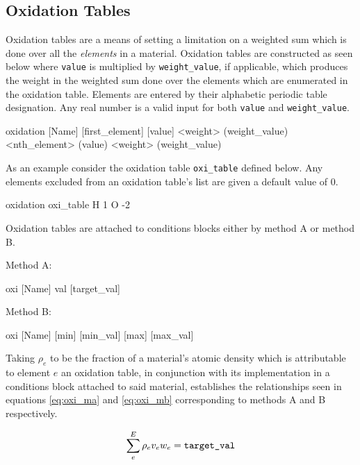 \subsection{Oxidation Tables}\label{ssec:oxidation}
Oxidation tables are a means of setting a limitation on a weighted sum which
is done over all the \textit{elements} in a material. Oxidation tables are
constructed as seen below where \texttt{value} is multiplied by
\texttt{weight\_value}, if applicable, which produces the weight in the weighted
sum done over the elements which are enumerated in the oxidation table. Elements
are entered by their alphabetic periodic table designation. Any real number
is a valid input for both \texttt{value} and \texttt{weight\_value}.

\begin{lt}
oxidation [Name]
[first_element] [value] <weight> (weight_value)
<nth_element> (value) <weight> (weight_value)
\end{lt}

As an example consider the oxidation table \texttt{oxi\_table} defined below. 
Any elements excluded from an oxidation table's list are given a default value
of 0.

\begin{li}
oxidation oxi_table
H   1
O   -2
\end{li}

Oxidation tables are attached to conditions blocks either by method A or
method B.

\noindent Method A:

\begin{lt}
oxi [Name] val [target_val]
\end{lt}

\noindent Method B:

\begin{lt}
oxi [Name] [min] [min_val] [max] [max_val]
\end{lt}

Taking $\rho_{e}$ to be the fraction of a material's atomic density which is
attributable to element $e$ an oxidation table, in conjunction with its
implementation in a conditions block attached to said material, establishes 
the relationships seen in equations \ref{eq:oxi_ma} and \ref{eq:oxi_mb} 
corresponding to methods A and B respectively.

\begin{equation}\label{eq:oxi_ma}
\sum_{e}^{E} \rho_{e} v_{e} w_{e} = \text{\texttt{target\_val}}
\end{equation}

